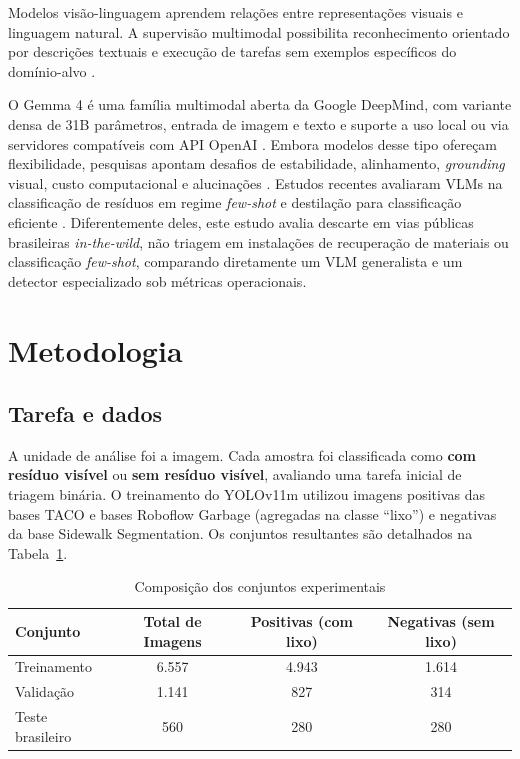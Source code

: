 \documentclass[kdmile,a4paper]{kdmile}
\begin{document}
Modelos visão-linguagem aprendem relações entre representações visuais e linguagem natural. A supervisão multimodal possibilita reconhecimento orientado por descrições textuais e execução de tarefas sem exemplos específicos do domínio-alvo \cite{Radford2021,Li2023}.

O Gemma 4 é uma família multimodal aberta da Google DeepMind, com variante densa de 31B parâmetros, entrada de imagem e texto e suporte a uso local ou via servidores compatíveis com API OpenAI \cite{GemmaTeam2026}. Embora modelos desse tipo ofereçam flexibilidade, pesquisas apontam desafios de estabilidade, alinhamento, \emph{grounding} visual, custo computacional e alucinações \cite{Li2025}. Estudos recentes avaliaram VLMs na classificação de resíduos em regime \emph{few-shot} e destilação para classificação eficiente \cite{Funk2025,Malla2026}. Diferentemente deles, este estudo avalia descarte em vias públicas brasileiras \emph{in-the-wild}, não triagem em instalações de recuperação de materiais ou classificação \emph{few-shot}, comparando diretamente um VLM generalista e um detector especializado sob métricas operacionais.

\section{Metodologia}
\label{sec:metodologia}

\subsection{Tarefa e dados}
\label{sec:tarefa-dados}

A unidade de análise foi a imagem. Cada amostra foi classificada como \textbf{com resíduo visível} ou \textbf{sem resíduo visível}, avaliando uma tarefa inicial de triagem binária. O treinamento do YOLOv11m utilizou imagens positivas das bases TACO e bases Roboflow Garbage (agregadas na classe ``lixo'') e negativas da base Sidewalk Segmentation. Os conjuntos resultantes são detalhados na Tabela~\ref{tab:conjuntos}.

\begin{table}[htbp]
\centering
\footnotesize
\caption{Composição dos conjuntos experimentais}
\label{tab:conjuntos}
\begin{tabular}{lccc}
\toprule
\textbf{Conjunto} & \textbf{Total de Imagens} & \textbf{Positivas (com lixo)} & \textbf{Negativas (sem lixo)} \\
\midrule
Treinamento & 6.557 & 4.943 & 1.614 \\
Validação & 1.141 & 827 & 314 \\
Teste brasileiro & 560 & 280 & 280 \\
\bottomrule
\end{tabular}
\end{table}
\end{document}
